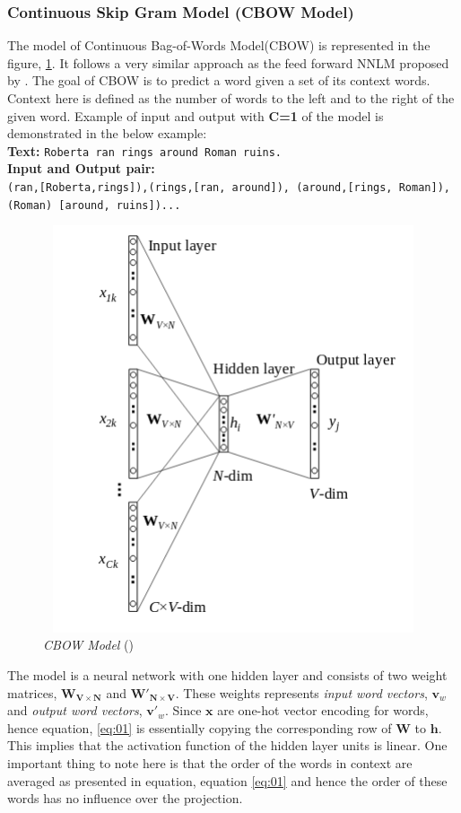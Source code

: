\subsubsection{Continuous Skip Gram Model (CBOW Model)}
The model of Continuous Bag-of-Words Model(CBOW) is represented in the figure, \ref{fig:cbow_sg}. It follows a very similar approach as the feed forward NNLM proposed by \cite{bengio2003neural}. The goal of CBOW is to predict a word given a set of its context words. Context here is defined as the number of words to the left and to the right of the given word. Example of input and output with \textbf{C=1} of the model is demonstrated in the below example:\\
\textbf{Text:} \texttt{Roberta ran rings around Roman ruins.}\\
\textbf{Input and Output pair:}\\
 \texttt{(ran,[Roberta,rings]),(rings,[ran, around]), (around,[rings, Roman]),(Roman)
 	[around, ruins])...}
\begin{figure}[H]
	\centering
	\includegraphics[width=15cm,height=12cm,keepaspectratio]{files/cbow.png}
	\caption{\textit{CBOW Model} (\cite{DBLP:journals/corr/Rong14})}
	\label{fig:cbow_sg}
\end{figure}
The model is a neural network with one hidden layer and consists of two weight matrices, $\mathbf{W_{V\times N}}$ and $\mathbf{W'_{N\times V}}$. These weights represents \textit{input word vectors}, $\mathbf{v}_w$ and \textit{output word vectors}, $\mathbf{v'}_w$. Since $\mathbf{x}$ are one-hot vector encoding for words, hence equation, \ref{eq:01} is essentially copying the corresponding row of $\mathbf{W}$ to $\mathbf{h}$. This implies that the activation function of the hidden layer units is linear. One important thing to note here is that the order of the words in context are averaged as presented in equation, equation \ref{eq:01} and hence the order of these words has no influence over the projection.
